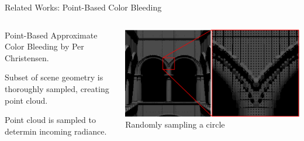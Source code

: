 \documentclass[10pt,compress,professionalfont]{beamer}
\begin{document}
\begin{frame}{Related Works: Point-Based Color Bleeding}



    \begin{columns}
        \begin{column}{0.6\textwidth}

    \vspace{-10mm}
    Point-Based Approximate Color Bleeding by Per Christensen.\\
    \vspace{8mm}

    Subset of scene geometry is thoroughly sampled, creating point cloud.\\
    \vspace{8mm}

    Point cloud is sampled to determin incoming radiance.

        \end{column}
        \begin{column}{0.4\textwidth}
            \vspace{-4mm}
            \includegraphics[width=\textwidth]{../img/pcloud}\\
            {\centering\scriptsize Randomly sampling a circle\\}
        \end{column}
    \end{columns}

\end{frame}
\end{document}
